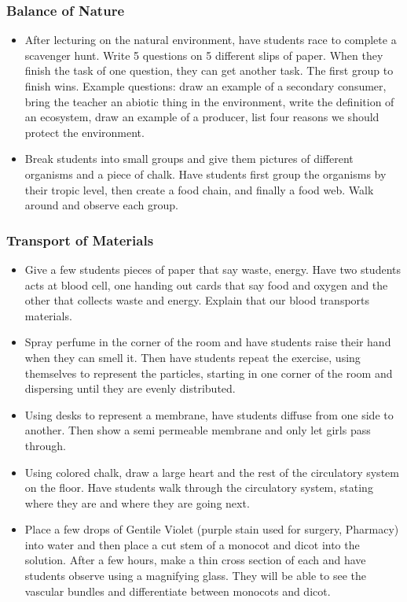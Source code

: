 \subsubsection{Balance of Nature}
\begin{itemize}
\item After lecturing on the natural environment, have students race to complete a scavenger hunt.  Write 5 questions on 5 different slips of paper.  When they finish the task of one question, they can get another task. The first group to finish wins. Example questions: draw an example of a secondary consumer, bring the teacher an abiotic thing in the environment, write the definition of an ecosystem, draw an example of a producer, list four reasons we should protect the environment.
\item Break students into small groups and give them pictures of different organisms and a piece of chalk.  Have students first group the organisms by their tropic level, then create a food chain, and finally a food web.  Walk around and observe each group. 
\end{itemize}

\subsubsection{Transport of Materials}
\begin{itemize}
\item Give a few students pieces of paper that say waste, energy.  Have two students acts at blood cell, one handing out cards that say food and oxygen and the other that collects waste and energy.  Explain that our blood transports materials.
\item Spray perfume in the corner of the room and have students raise their hand when they can smell it.  Then have students repeat the exercise, using themselves to represent the particles, starting in one corner of the room and dispersing until they are evenly distributed.
\item Using desks to represent a membrane, have students diffuse from one side to another.  Then show a semi permeable membrane and only let girls pass through.
\item Using colored chalk, draw a large heart and the rest of the circulatory system on the floor.  Have students walk through the circulatory system, stating where they are and where they are going next.
\item Place a few drops of Gentile Violet (purple stain used for surgery, Pharmacy) into water and then place a cut stem of a monocot and dicot into the solution.  After a few hours, make a thin cross section of each and have students observe using a magnifying glass.  They will be able to see the vascular bundles and differentiate between monocots and dicot. 
\end{itemize}

